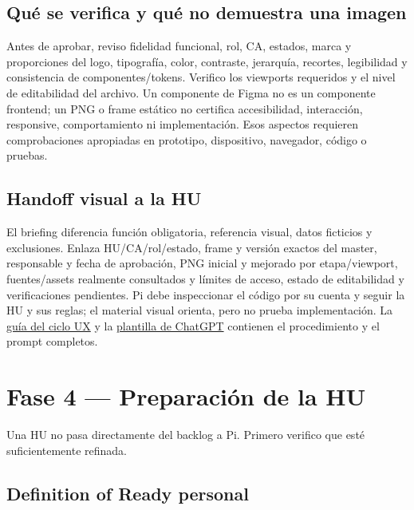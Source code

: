 \documentclass[11pt,a4paper]{article}
\begin{document}
\subsection{Qué se verifica y qué no demuestra una imagen}

Antes de aprobar, reviso fidelidad funcional, rol, CA, estados, marca y proporciones del logo, tipografía, color, contraste, jerarquía, recortes, legibilidad y consistencia de componentes/tokens. Verifico los viewports requeridos y el nivel de editabilidad del archivo. Un componente de Figma no es un componente frontend; un PNG o frame estático no certifica accesibilidad, interacción, responsive, comportamiento ni implementación. Esos aspectos requieren comprobaciones apropiadas en prototipo, dispositivo, navegador, código o pruebas.

\subsection{Handoff visual a la HU}

El briefing diferencia función obligatoria, referencia visual, datos ficticios y exclusiones. Enlaza HU/CA/rol/estado, frame y versión exactos del master, responsable y fecha de aprobación, PNG inicial y mejorado por etapa/viewport, fuentes/assets realmente consultados y límites de acceso, estado de editabilidad y verificaciones pendientes. Pi debe inspeccionar el código por su cuenta y seguir la HU y sus reglas; el material visual orienta, pero no prueba implementación. La \href{https://github.com/Alex-Fernandez-2003/workflow-with-gentle-ai/blob/docs/workflow-showcase/docs/ux/flujo-referencias-visuales.md}{guía del ciclo UX} y la \href{https://github.com/Alex-Fernandez-2003/workflow-with-gentle-ai/blob/docs/workflow-showcase/docs/ux/plantilla-chatgpt-mejora-referencias-visuales.md}{plantilla de ChatGPT} contienen el procedimiento y el prompt completos.

\section{Fase 4 — Preparación de la HU}

Una HU no pasa directamente del backlog a Pi. Primero verifico que esté suficientemente refinada.

\subsection{Definition of Ready personal}
\end{document}
